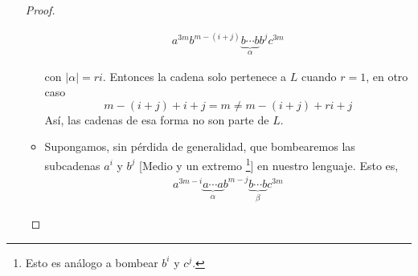 \documentclass{article}
\begin{document}
\begin{enumerate}
\begin{proof}
\begin{itemize}
        \begin{eqnarray*}
          a^{3m} b^{m- (i + j)}\underbrace{b \dotsm b}_{\alpha} b^{j} c^{3m}
        \end{eqnarray*}
        
        \begin{center}
        \end{center}
        
        con $|\alpha| = ri$. Entonces la cadena solo pertenece a $L$ cuando $r = 1$, en otro caso
        \[
        m - (i + j) + i + j = m \not= m - (i + j) + ri + j
        \]
        Así, las cadenas de esa forma no son parte de $L$.
      \item Supongamos, sin pérdida de generalidad, que bombearemos las subcadenas $a^{i}$ y $b^{j}$
        [Medio y un extremo \footnote{Esto es análogo a bombear $b^{i}$ y $c^{j}$.}] en nuestro lenguaje.
        Esto es,
        \begin{eqnarray*}
          a^{3m - i} \underbrace{a \dotsm a}_{\alpha} b^{m- j}\underbrace{b \dotsm b}_{\beta} c^{3m}
        \end{eqnarray*}
        
        \begin{center}
        \end{center}
        

\end{itemize}
\end{proof}
\end{enumerate}
\end{document}
